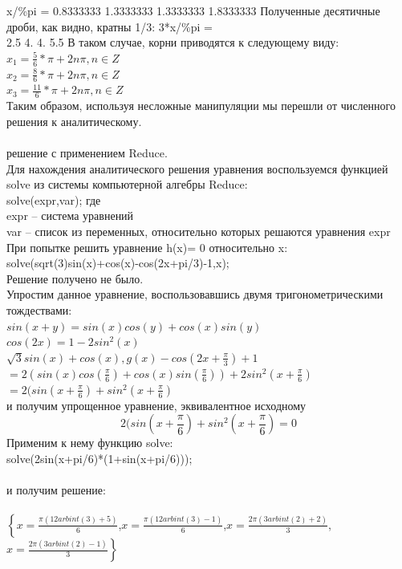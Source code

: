 \documentclass[russian,utf8,nocolumnxxxi,nocolumnxxxii]{eskdtext}
\begin{document}
x/\%pi =
0.8333333 1.3333333 1.3333333 1.8333333
Полученные десятичные дроби, как видно, кратны 1/3:
3*x/\%pi =
\\2.5 4. 4. 5.5
\newpage
В таком случае, корни приводятся к следующему виду:\\
$x_1=\frac{5}{6}*\pi+2n\pi,n\in Z$\\
$x_2=\frac{8}{6}*\pi+2n\pi,n\in Z$\\
$x_3=\frac{11}{6}*\pi+2n\pi,n\in Z$\\
Таким образом, используя несложные манипуляции мы перешли от численного решения к аналитическому.\\
\\
{ решение с применением Reduce.}\\
Для нахождения аналитического решения уравнения воспользуемся функцией solve из системы компьютерной алгебры Reduce:\\
solve(expr,var); где\\
expr – система уравнений\\
var – список из переменных, относительно которых решаются уравнения expr\\

При попытке решить уравнение h(x)= 0 относительно x:\\
solve(sqrt(3)sin(x)+cos(x)-cos(2x+pi/3)-1,x);\\
Решение получено не было.\\
Упростим данное уравнение, воспользовавшись двумя тригонометрическими тождествами:\\ $sin(x+y)=sin(x)cos(y)+cos(x)sin(y)$\\
$cos(2x)=1-2sin^2(x)$\\
$\sqrt{3}sin(x)+cos(x),g(x)-cos(2x+\frac{\pi}{3})+1$\\ $=2(sin(x)cos(\frac{\pi}{6})+cos(x)sin(\frac{\pi}{6}))+2sin^2(x+\frac{\pi}{6})$\\ $=2(sin(x+\frac{\pi}{6})+sin^2(x+\frac{\pi}{6})$\\
и получим упрощенное уравнение, эквивалентное исходному
$$2(sin(x+\frac{\pi}{6})+sin^2(x+\frac{\pi}{6})=0$$
Применим к нему функцию solve:\\
solve(2sin(x+pi/6)*(1+sin(x+pi/6)));\\
\\

и получим решение:\\
\\
$\left\{x=\frac{\pi(12arbint(3)+5)}{6}\right.$,$x=\frac{\pi(12arbint(3)-1)}{6}$,$x=\frac{2\pi(3arbint(2)+2)}{3}$,
$\left.x=\frac{2\pi(3arbint(2)-1)}{3}\right\}$\\
\\
\end{document}
